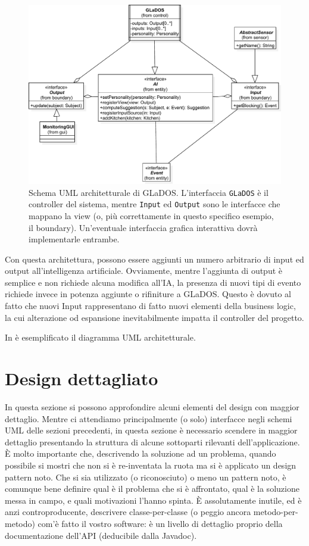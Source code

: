 \documentclass[a4paper,12pt]{report}
\begin{document}
\begin{figure}[h]
\centering{}
\includegraphics[width=\textwidth]{img/arch}
\caption{Schema UML architetturale di GLaDOS. L'interfaccia \texttt{GLaDOS} è il controller del sistema, mentre \texttt{Input} ed \texttt{Output} sono le interfacce che mappano la view (o, più correttamente in questo specifico esempio, il boundary). Un'eventuale interfaccia grafica interattiva dovrà implementarle entrambe.}
\label{img:goodarch}
\end{figure}

Con questa architettura, possono essere aggiunti un numero arbitrario di input ed output
all'intelligenza artificiale.
%
Ovviamente, mentre l'aggiunta di output è semplice e non richiede alcuna modifica all'IA, la
presenza di nuovi tipi di evento richiede invece in potenza aggiunte o rifiniture a GLaDOS.
%
Questo è dovuto al fatto che nuovi Input rappresentano di fatto nuovi elementi della business
logic, la cui alterazione od espansione inevitabilmente impatta il controller del progetto.

In  è esemplificato il diagramma UML architetturale.


\section{Design dettagliato}

In questa sezione si possono approfondire alcuni elementi del design con maggior dettaglio.
%
Mentre ci attendiamo principalmente (o solo) interfacce negli schemi UML delle sezioni precedenti,
in questa sezione è necessario scendere in maggior dettaglio presentando la struttura di alcune sottoparti rilevanti dell'applicazione.
%
È molto importante che, descrivendo la soluzione ad un problema, quando possibile si mostri che non si è re-inventata la ruota ma si è applicato un design pattern noto.
%
Che si sia utilizzato (o riconosciuto) o meno un pattern noto, è comunque bene definire qual è il problema che si è affrontato, qual è la soluzione messa in campo, e quali motivazioni l'hanno spinta.
%
È assolutamente inutile, ed è anzi controproducente, descrivere classe-per-classe (o peggio ancora metodo-per-metodo) com'è fatto il vostro software: è un livello di dettaglio proprio della documentazione dell'API (deducibile dalla Javadoc).
\end{document}
